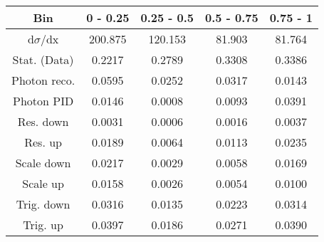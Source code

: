 \documentclass{article}
\begin{document}
\begin{table}[H]
\centering
\begin{tabular}{|c|c|c|c|c|}
\hline
Bin & 0 - 0.25 & 0.25 - 0.5 & 0.5 - 0.75 & 0.75 - 1 \\
\hline
d$\sigma$/dx & 200.875 & 120.153 & 81.903 & 81.764 \\
\hline
Stat. (Data) & 0.2217 & 0.2789 & 0.3308 & 0.3386 \\
\hline
Photon reco. & 0.0595 & 0.0252 & 0.0317 & 0.0143 \\
\hline
Photon PID & 0.0146 & 0.0008 & 0.0093 & 0.0391 \\
\hline
Res. down & 0.0031 & 0.0006 & 0.0016 & 0.0037 \\
\hline
Res. up & 0.0189 & 0.0064 & 0.0113 & 0.0235 \\
\hline
Scale down & 0.0217 & 0.0029 & 0.0058 & 0.0169 \\
\hline
Scale up & 0.0158 & 0.0026 & 0.0054 & 0.0100 \\
\hline
Trig. down & 0.0316 & 0.0135 & 0.0223 & 0.0314 \\
\hline
Trig. up & 0.0397 & 0.0186 & 0.0271 & 0.0390 \\
\hline
\end{tabular}
\end{table}
\end{document}
